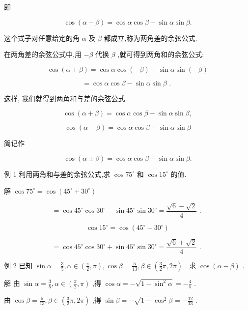 \documentclass[10pt]{article}
\begin{document}
即

\[
\cos \left( {\alpha  - \beta }\right)  = \cos \alpha \cos \beta  + \sin \alpha \sin \beta .
\]

这个式子对任意给定的角 \(\alpha\) 及 \(\beta\) 都成立,称为两角差的余弦公式.

在两角差的余弦公式中,用 \(- \beta\) 代换 \(\beta\) ,就可得到两角和的余弦公式:

\[
\cos \left( {\alpha  + \beta }\right)  = \cos \alpha \cos \left( {-\beta }\right)  + \sin \alpha \sin \left( {-\beta }\right)
\]

\[
= \cos \alpha \cos \beta  - \sin \alpha \sin \beta \text{ . }
\]

这样, 我们就得到两角和与差的余弦公式

\[
\cos \left( {\alpha  + \beta }\right)  = \cos \alpha \cos \beta  - \sin \alpha \sin \beta ,
\]

\[
\cos \left( {\alpha  - \beta }\right)  = \cos \alpha \cos \beta  + \sin \alpha \sin \beta
\]

简记作

\[
\cos \left( {\alpha  \pm  \beta }\right)  = \cos \alpha \cos \beta  \mp  \sin \alpha \sin \beta .
\]

例 1 利用两角和与差的余弦公式,求 \(\cos {75}^{ \circ  }\) 和 \(\cos {15}^{ \circ  }\) 的值.

解 \(\cos {75}^{ \circ  } = \cos \left( {{45}^{ \circ  } + {30}^{ \circ  }}\right)\)

\[
= \cos {45}^{ \circ  }\cos {30}^{ \circ  } - \sin {45}^{ \circ  }\sin {30}^{ \circ  } = \frac{\sqrt{6} - \sqrt{2}}{4}\text{ . }
\]

\[
\cos {15}^{ \circ  } = \cos \left( {{45}^{ \circ  } - {30}^{ \circ  }}\right)
\]

\[
= \cos {45}^{ \circ  }\cos {30}^{ \circ  } + \sin {45}^{ \circ  }\sin {30}^{ \circ  } = \frac{\sqrt{6} + \sqrt{2}}{4}\text{ . }
\]

例 2 已知 \(\sin \alpha  = \frac{3}{5},\alpha  \in  \left( {\frac{\pi }{2},\pi }\right) ,\cos \beta  = \frac{5}{13},\beta  \in  \left( {\frac{3}{2}\pi ,{2\pi }}\right)\) . 求 \(\cos \left( {\alpha  - \beta }\right)\) .

解 由 \(\sin \alpha  = \frac{3}{5},\alpha  \in  \left( {\frac{\pi }{2},\pi }\right)\) ,得 \(\cos \alpha  =  - \sqrt{1 - {\sin }^{2}\alpha } =  - \frac{4}{5}\) .

由 \(\cos \beta  = \frac{5}{13},\beta  \in  \left( {\frac{3}{2}\pi ,{2\pi }}\right)\) ,得 \(\sin \beta  =  - \sqrt{1 - {\cos }^{2}\beta } =  - \frac{12}{13}\) .
\end{document}
